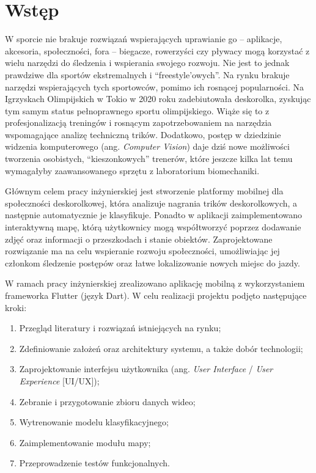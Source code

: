 \newpage
\section{Wstęp}
        
        W sporcie nie brakuje rozwiązań wspierających uprawianie go – aplikacje, akcesoria, społeczności, fora – biegacze, rowerzyści czy pływacy mogą korzystać z wielu narzędzi do śledzenia i wspierania swojego rozwoju. Nie jest to jednak prawdziwe dla sportów ekstremalnych i \enquote{freestyle'owych}. Na rynku brakuje narzędzi wspierających tych sportowców, pomimo ich rosnącej popularności. Na Igrzyskach Olimpijskich w Tokio w 2020 roku zadebiutowała deskorolka, zyskując tym samym status pełnoprawnego sportu olimpijskiego. Wiąże się to z profesjonalizacją treningów i rosnącym zapotrzebowaniem na narzędzia wspomagające analizę techniczną trików. Dodatkowo, postęp w dziedzinie widzenia komputerowego (ang. \textit{Computer Vision}) daje dziś nowe możliwości tworzenia osobistych, \enquote{kieszonkowych} trenerów, które jeszcze kilka lat temu wymagałyby zaawansowanego sprzętu z laboratorium biomechaniki.

        Głównym celem pracy inżynierskiej jest stworzenie platformy mobilnej dla społeczności deskorolkowej, która analizuje nagrania trików deskorolkowych, a następnie automatycznie je klasyfikuje. Ponadto w aplikacji zaimplementowano interaktywną mapę, którą użytkownicy mogą współtworzyć poprzez dodawanie zdjęć oraz informacji o przeszkodach i stanie obiektów. Zaprojektowane rozwiązanie ma na celu wspieranie rozwoju społeczności, umożliwiając jej członkom śledzenie postępów oraz łatwe lokalizowanie nowych miejsc do jazdy.

        W ramach pracy inżynierskiej zrealizowano aplikację mobilną z wykorzystaniem frameworka Flutter (język Dart). W celu realizacji projektu podjęto następujące kroki:
        \begin{enumerate}
            \item Przegląd literatury i rozwiązań istniejących na rynku;
            \item Zdefiniowanie założeń oraz architektury systemu, a także dobór technologii;
            \item Zaprojektowanie interfejsu użytkownika (ang. \textit{User Interface} / \textit{User Experience} [UI/UX]);
            \item Zebranie i przygotowanie zbioru danych wideo;
            \item Wytrenowanie modelu klasyfikacyjnego;
            \item Zaimplementowanie modułu mapy;
            \item Przeprowadzenie testów funkcjonalnych.
        \end{enumerate}
        
